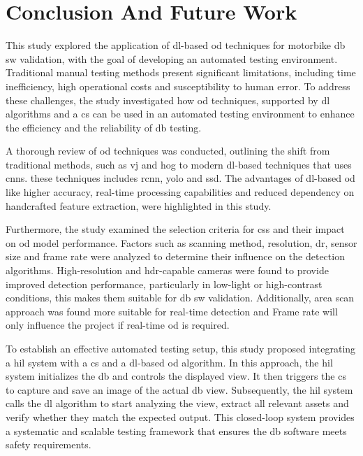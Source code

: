 \chapter{Conclusion And Future Work}

This study explored the application of \gls{dl}-based \gls{od} techniques for motorbike \gls{db} \gls{sw} validation, with the goal of developing an automated testing environment. Traditional manual testing methods present significant limitations, including time inefficiency, high operational costs and susceptibility to human error. To address these challenges, the study investigated how \gls{od} techniques, supported by \gls{dl} algorithms and a \gls{cs} can be used in an automated testing environment to enhance the efficiency and the reliability of \gls{db} testing.

A thorough review of \gls{od} techniques was conducted, outlining the shift from traditional methods, such as \gls{vj} and \gls{hog} to modern \gls{dl}-based techniques that uses \gls{cnn}s. these techniques includes \gls{rcnn}, \gls{yolo} and \gls{ssd}. The advantages of \gls{dl}-based \gls{od} like higher accuracy, real-time processing capabilities and reduced dependency on handcrafted feature extraction, were highlighted in this study.

Furthermore, the study examined the selection criteria for \gls{cs}s and their impact on \gls{od} model performance. Factors such as scanning method, resolution, \gls{dr}, sensor size and frame rate were analyzed to determine their influence on the detection algorithms. High-resolution and \gls{hdr}-capable cameras were found to provide improved detection performance, particularly in low-light or high-contrast conditions, this makes them suitable for \gls{db} \gls{sw} validation. Additionally, area scan approach was found more suitable for real-time detection and Frame rate will only influence the project if real-time \gls{od} is required.

To establish an effective automated testing setup, this study proposed integrating a \gls{hil} system with a \gls{cs} and a \gls{dl}-based \gls{od} algorithm. In this approach, the \gls{hil} system initializes the \gls{db} and controls the displayed view. It then triggers the \gls{cs} to capture and save an image of the actual \gls{db} view. Subsequently, the \gls{hil} system calls the \gls{dl} algorithm to start analyzing the view, extract all relevant assets and verify whether they match the expected output. This closed-loop system provides a systematic and scalable testing framework that ensures the \gls{db} software meets safety requirements.

